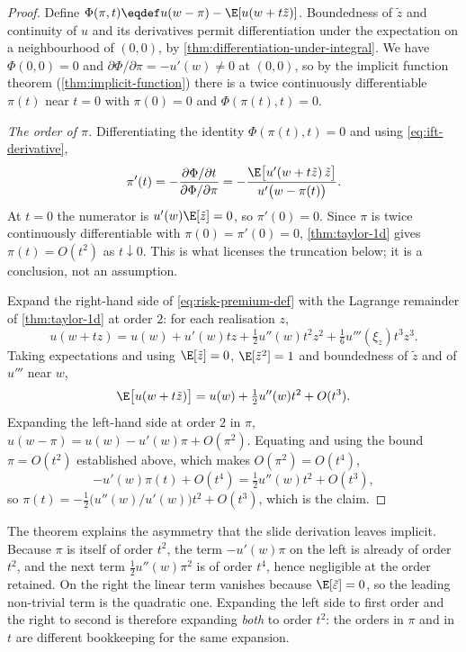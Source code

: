 \begin{proof}
	Define $\Phi(\pi,t)\eqdef u(w-\pi)-\E[u(w+t\tilde z)]$. Boundedness of
	$\tilde z$ and continuity of $u$ and its derivatives permit differentiation under
	the expectation on a neighbourhood of $(0,0)$, by
	\autoref{thm:differentiation-under-integral}. We have $\Phi(0,0)=0$ and
	$\partial\Phi/\partial\pi=-u'(w)\neq0$ at $(0,0)$, so by the implicit function
	theorem (\autoref{thm:implicit-function}) there is a twice continuously
	differentiable $\pi(t)$ near $t=0$ with $\pi(0)=0$ and $\Phi(\pi(t),t)=0$.

	\emph{The order of $\pi$.} Differentiating the identity $\Phi(\pi(t),t)=0$ and
	using \eqref{eq:ift-derivative},
	\[
		\pi'(t)=-\frac{\partial\Phi/\partial t}{\partial\Phi/\partial\pi}
		=-\frac{\E\bigl[u'(w+t\tilde z)\,\tilde z\bigr]}{u'\bigl(w-\pi(t)\bigr)} .
	\]
	At $t=0$ the numerator is $u'(w)\E[\tilde z]=0$, so $\pi'(0)=0$. Since $\pi$ is
	twice continuously differentiable with $\pi(0)=\pi'(0)=0$,
	\autoref{thm:taylor-1d} gives $\pi(t)=O(t^2)$ as $t\downarrow0$. This is what
	licenses the truncation below; it is a conclusion, not an assumption.

	Expand the right-hand side of \eqref{eq:risk-premium-def} with the Lagrange
	remainder of \autoref{thm:taylor-1d} at order $2$: for each realisation $z$,
	\[
		u(w+tz)=u(w)+u'(w)tz+\tfrac12u''(w)t^2z^2+\tfrac16u'''(\xi_z)t^3z^3 .
	\]
	Taking expectations and using $\E[\tilde z]=0$, $\E[\tilde z^2]=1$ and
	boundedness of $\tilde z$ and of $u'''$ near $w$,
	\[
		\E\bigl[u(w+t\tilde z)\bigr]=u(w)+\tfrac12u''(w)t^2+O(t^3).
	\]
	Expanding the left-hand side at order $2$ in $\pi$,
	$u(w-\pi)=u(w)-u'(w)\pi+O(\pi^2)$. Equating and using the bound
	$\pi=O(t^2)$ established above, which makes $O(\pi^2)=O(t^4)$,
	\[
		-u'(w)\pi(t)+O(t^4)=\tfrac12u''(w)t^2+O(t^3),
	\]
	so $\pi(t)=-\tfrac12\bigl(u''(w)/u'(w)\bigr)t^2+O(t^3)$, which is the claim.
\end{proof}

\begin{remark}
	\label{rem:risk-premium-orders}
	The theorem explains the asymmetry that the slide derivation leaves implicit.
	Because $\pi$ is itself of order $t^2$, the term $-u'(w)\pi$ on the left is
	already of order $t^2$, and the next term $\tfrac12u''(w)\pi^2$ is of order
	$t^4$, hence negligible at the order retained. On the right the linear term
	vanishes because $\E[\tilde\varepsilon]=0$, so the leading non-trivial term is
	the quadratic one. Expanding the left side to first order and the right to
	second is therefore expanding \emph{both} to order $t^2$: the orders in $\pi$
	and in $t$ are different bookkeeping for the same expansion.
\end{remark}

